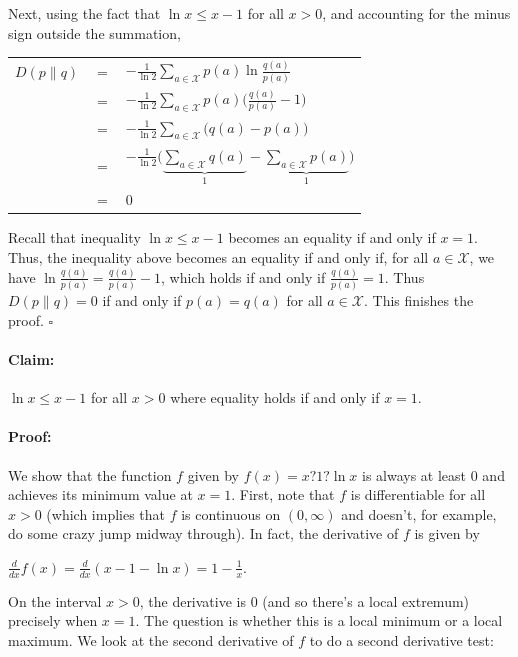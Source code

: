 \documentclass[6008notes.tex]{subfiles}
\begin{document}
Next, using the fact that $\ln x\le x-1$ for all $x>0$, and accounting for the minus sign outside the summation,

{\renewcommand{\arraystretch}{1.5}
\begin{tabular}{l l l}
$D(p\parallel q)$ & $=$ & $-\frac{1}{\ln 2}\sum _{a\in \mathcal{X}}p(a)\ln \frac{q(a)}{p(a)}$ \\
  & $=$ & $-\frac{1}{\ln 2}\sum _{a\in \mathcal{X}}p(a)\Big(\frac{q(a)}{p(a)}-1\Big)$ \\
  & $=$ & $-\frac{1}{\ln 2}\sum _{a\in \mathcal{X}}\big (q(a)-p(a)\big )$ \\
  & $=$ & $-\frac{1}{\ln 2}\big (\underbrace{\sum _{a\in \mathcal{X}}q(a)}_{1}-\underbrace{\sum _{a\in \mathcal{X}}p(a)}_{1}\big )$ \\
  & $=$ & $0$ 
\end{tabular}}
			
Recall that inequality $\ln x\le x-1$ becomes an equality if and only if $x=1$. Thus, the inequality above becomes an equality if and only if, for all $a\in \mathcal{X}$, we have $\ln \frac{q(a)}{p(a)}=\frac{q(a)}{p(a)}-1$, which holds if and only if $\frac{q(a)}{p(a)}=1$. Thus $D(p\parallel q)=0$ if and only if $p(a)=q(a)$ for all $a\in \mathcal{X}$. This finishes the proof. $\square$

\paragraph{Claim:} $\ln x\le x-1$ for all $x>0$ where equality holds if and only if $x=1$.

\paragraph{Proof:} We show that the function $f$ given by $f(x)=x?1?\ln x$ is always at least 0 and achieves its minimum value at $x=1$. First, note that $f$ is differentiable for all $x>0$ (which implies that $f$ is continuous on $(0,\infty)$ and doesn't, for example, do some crazy jump midway through). In fact, the derivative of $f$ is given by

{\centering$\frac{d}{dx}f(x)=\frac{d}{dx}(x-1-\ln x)=1-\frac{1}{x}.$ \par}
 
On the interval $x>0$, the derivative is 0 (and so there's a local extremum) precisely when $x=1$. The question is whether this is a local minimum or a local maximum. We look at the second derivative of $f$ to do a second derivative test:
\end{document}
